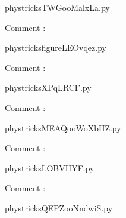     \newcommand{\CaptionFigTWGooMalxLa}{<+Type your caption here+>}
    \begin{center}
        
    \end{center}
    phystricksTWGooMalxLa.py

    Comment : 

    \clearpage
    


    \newcommand{\CaptionFigfigureLEOvqez}{<+Type your caption here+>}
    \begin{center}
        
    \end{center}
    phystricksfigureLEOvqez.py

    Comment : 

    \clearpage
    


    \newcommand{\CaptionFigXPqLRCF}{<+Type your caption here+>}
    \begin{center}
        
    \end{center}
    phystricksXPqLRCF.py

    Comment : 

    \clearpage
    


    \newcommand{\CaptionFigMEAQooWoXbHZ}{<+Type your caption here+>}
    \begin{center}
        
    \end{center}
    phystricksMEAQooWoXbHZ.py

    Comment : 

    \clearpage
    


    \newcommand{\CaptionFigLOBVHYF}{<+Type your caption here+>}
    \begin{center}
        
    \end{center}
    phystricksLOBVHYF.py

    Comment : 

    \clearpage
    


    \newcommand{\CaptionFigQEPZooNndwiS}{<+Type your caption here+>}
    \begin{center}
        
    \end{center}
    phystricksQEPZooNndwiS.py

